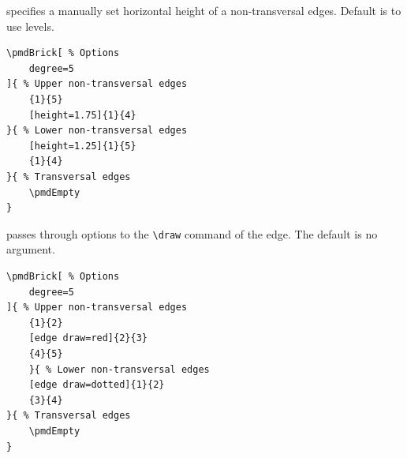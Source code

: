 \documentclass{ltxdoc}
\begin{document}
specifies a manually set horizontal height of a non-transversal edges. Default is to use levels.
\begin{center}
    \begin{minipage}{\dimexpr0.85\textwidth-2\fboxrule-2\fboxsep\relax}
        \begin{minipage}[c]{0.4\linewidth}
\begin{verbatim}
\pmdBrick[ % Options
    degree=5
]{ % Upper non-transversal edges
    {1}{5}
    [height=1.75]{1}{4}
}{ % Lower non-transversal edges
    [height=1.25]{1}{5}
    {1}{4}
}{ % Transversal edges
    \pmdEmpty
}
\end{verbatim}
        \end{minipage}
        \hfill
        \begin{minipage}[c]{0.4\linewidth}
        \end{minipage}
    \end{minipage}%
\end{center}

passes through options to the \verb`\draw` command of the edge. The default is no argument.
\begin{center}
    \begin{minipage}{\dimexpr0.85\textwidth-2\fboxrule-2\fboxsep\relax}
        \begin{minipage}[c]{0.4\linewidth}
\begin{verbatim}
\pmdBrick[ % Options
    degree=5
]{ % Upper non-transversal edges
    {1}{2}
    [edge draw=red]{2}{3}
    {4}{5}
    }{ % Lower non-transversal edges
    [edge draw=dotted]{1}{2}
    {3}{4}
}{ % Transversal edges
    \pmdEmpty
}
\end{verbatim}
        \end{minipage}
        \hfill
        \begin{minipage}[c]{0.4\linewidth}
        \end{minipage}
    \end{minipage}%
\end{center}
\end{document}
